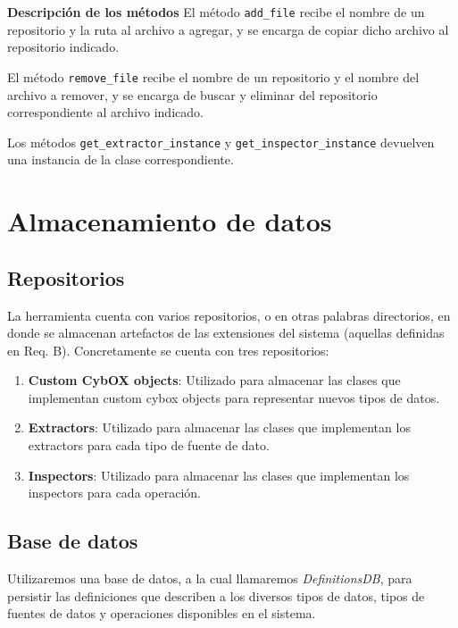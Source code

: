 \textbf{Descripción de los métodos} \newline
El método \texttt{add\_file} recibe el nombre de un repositorio y la ruta al archivo a agregar, y se encarga de copiar dicho archivo al repositorio indicado.

El método \texttt{remove\_file} recibe el nombre de un repositorio y el nombre del archivo a remover, y se encarga de buscar y eliminar del repositorio correspondiente al archivo indicado.

Los métodos \texttt{get\_extractor\_instance} y \texttt{get\_inspector\_instance} devuelven una instancia de la clase correspondiente.

\section{Almacenamiento de datos}
\label{almacenamientoDeDatos}
\subsection{Repositorios} \label{repositorios}
La herramienta cuenta con varios repositorios, o en otras palabras directorios, en donde se almacenan artefactos de las extensiones del sistema (aquellas definidas en Req. B). Concretamente se cuenta con tres repositorios:

\begin{enumerate}[topsep=0pt, parsep=0pt, partopsep=0pt]
\item \textbf{Custom CybOX objects}: Utilizado para almacenar las clases que implementan custom cybox objects para representar nuevos tipos de datos.
\item \textbf{Extractors}: Utilizado para almacenar las clases que implementan los extractors para cada tipo de fuente de dato.
\item \textbf{Inspectors}: Utilizado para almacenar las clases que implementan los inspectors para cada operación.
\end{enumerate}

\subsection{Base de datos}
Utilizaremos una base de datos, a la cual llamaremos \emph{DefinitionsDB}, para persistir las definiciones que describen a los diversos tipos de datos, tipos de fuentes de datos y operaciones disponibles en el sistema.

